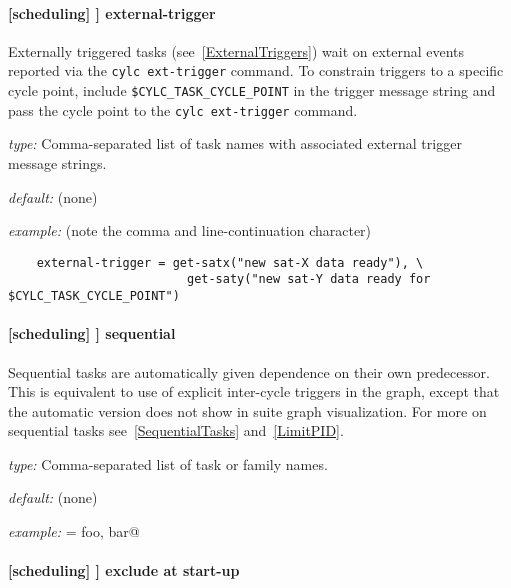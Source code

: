\paragraph[external-trigger]{[scheduling] \textrightarrow [[special tasks]] \textrightarrow external-trigger}

Externally triggered tasks (see~\ref{ExternalTriggers}) wait on external events
reported via the \lstinline=cylc ext-trigger= command.  To constrain triggers
to a specific cycle point, include \lstinline=$CYLC_TASK_CYCLE_POINT= in the
trigger message string and pass the cycle point to the \lstinline=cylc ext-trigger= command.

\begin{myitemize}
    \item {\em type:} Comma-separated list of task names with associated
        external trigger message strings.
    \item {\em default:} (none)
    \item {\em example:} (note the comma and line-continuation character)
\begin{lstlisting}
    external-trigger = get-satx("new sat-X data ready"), \
                         get-saty("new sat-Y data ready for $CYLC_TASK_CYCLE_POINT")
\end{lstlisting}
\end{myitemize}


\paragraph[sequential]{[scheduling] \textrightarrow [[special tasks]] \textrightarrow sequential}

Sequential tasks are automatically given dependence on their own
predecessor. This is equivalent to use of explicit inter-cycle triggers
in the graph, except that the automatic version does not show in suite
graph visualization. For more on sequential tasks see~\ref{SequentialTasks}
and~\ref{LimitPID}.

\begin{myitemize}
    \item {\em type:} Comma-separated list of task or family names.
    \item {\em default:} (none)
    \item {\em example:} \lstinline@sequential = foo, bar@
\end{myitemize}

\paragraph[exclude at start-up]{[scheduling] \textrightarrow [[special tasks]] \textrightarrow exclude at start-up}
\label{EASU}

